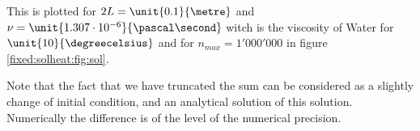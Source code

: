 This is plotted for $2L=\unit{0.1}{\metre}$ and $\nu=\unit{1.307\cdot 10^{-6}}{\pascal\second}$ witch is the viscosity of Water for $\unit{10}{\degreecelsius}$ and for $n_{max}=1'000'000$ in figure \ref{fixed:solheat:fig:sol}.

Note that the fact that we have truncated the sum can be considered as a slightly change of initial condition, and an analytical solution of this solution.
Numerically the difference is of the level of the numerical precision.

\HeatSolaa

\HeatSola

\HeatSolb

\HeatSolc

\HeatSold

\HeatSole

\HeatSolf

\HeatSolg

